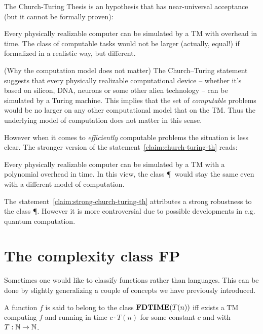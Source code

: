 The Church-Turing Thesis is an hypothesis that has near-universal acceptance (but it cannot be formally proven):
\begin{claim}
	Every physically realizable computer can be simulated by a TM with overhead in time. The class of computable tasks would not be larger (actually, equal!) if formalized in a realistic way, but different.
	\label{claim:church-turing-th}
\end{claim}
\begin{remark}(Why the computation model does not matter)
	The Church--Turing statement suggests that every physically realizable computational device -- whether it's based on silicon, DNA, neurons or some other alien technology -- can be simulated by a Turing machine.
	This implies that the set of \emph{computable} problems would be no larger on any other computational model that on the TM. Thus the underlying model of computation does not matter in this sense.
\end{remark}
However when it comes to \emph{efficiently} computable problems the situation is less clear.
The stronger version of the statement~\ref{claim:church-turing-th} reads:
\begin{claim}
	Every physically realizable computer can be simulated by a TM with a polynomial overhead in time.
	In this view, the class \P~would stay the same even with a different model of computation.
	\label{claim:strong-church-turing-th}
\end{claim}
The statement~\ref{claim:strong-church-turing-th} attributes a strong robustness to the class \P.
However it is more controversial due to possible developments in e.g. quantum computation.

\section{The complexity class FP}
Sometimes one would like to classify functions rather than languages. This can be done by slightly generalizing a couple of concepts we have previously introduced. \\
\begin{definition}
	A function $f$ is said to belong to the class \(\textbf{FDTIME}(T(n))\) iff exists a TM computing $f$ and running in time \(c \cdot T(n)\) for some constant $c$ and with \(T:\mathbb{N} \rightarrow \mathbb{N} \).
	\label{def:FDTIME-class}
\end{definition}

